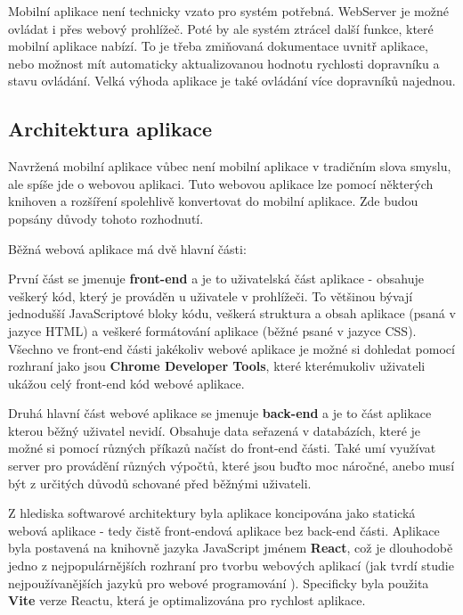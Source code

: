 Mobilní aplikace není technicky vzato pro systém potřebná. WebServer je možné ovládat i přes webový prohlížeč. Poté by ale systém ztrácel další funkce, které mobilní aplikace nabízí. To je třeba zmiňovaná dokumentace uvnitř aplikace, nebo možnost mít automaticky aktualizovanou hodnotu rychlosti dopravníku a stavu ovládání. Velká výhoda aplikace je také ovládání více dopravníků najednou.

\subsection{Architektura aplikace}

Navržená mobilní aplikace vůbec není mobilní aplikace v tradičním slova smyslu, ale spíše jde o webovou aplikaci. Tuto webovou aplikace lze pomocí některých knihoven a rozšíření spolehlivě konvertovat do mobilní aplikace. Zde budou popsány důvody tohoto rozhodnutí.

Běžná webová aplikace má dvě hlavní části:

První část se jmenuje \textbf{front-end} a je to uživatelská část aplikace - obsahuje veškerý kód, který je prováděn u uživatele v prohlížeči. To většinou bývají jednodušší JavaScriptové bloky kódu, veškerá struktura a obsah aplikace (psaná v jazyce HTML) a veškeré formátování aplikace (běžné psané v jazyce CSS). Všechno ve front-end části jakékoliv webové aplikace je možné si dohledat pomocí rozhraní jako jsou \textbf{Chrome Developer Tools}, které kterémukoliv uživateli ukážou celý front-end kód webové aplikace.

Druhá hlavní část webové aplikace se jmenuje \textbf{back-end} a je to část aplikace kterou běžný uživatel nevidí. Obsahuje data seřazená v databázích, které je možné si pomocí různých příkazů načíst do front-end části. Také umí využívat server pro provádění různých výpočtů, které jsou buďto moc náročné, anebo musí být z určitých důvodů schované před běžnými uživateli.

Z hlediska softwarové architektury byla aplikace koncipována jako statická webová aplikace - tedy čistě front-endová aplikace bez back-end části. Aplikace byla postavená na knihovně jazyka JavaScript jménem \textbf{React}, což je dlouhodobě jedno z nejpopulárnějších rozhraní pro tvorbu webových aplikací (jak tvrdí studie nejpoužívanějších jazyků pro webové programování \cite{ReactWebDeveloperPopularity}). Specificky byla použita \textbf{Vite} verze Reactu, která je optimalizována pro rychlost aplikace.
\cite{ViteReactWeb}

